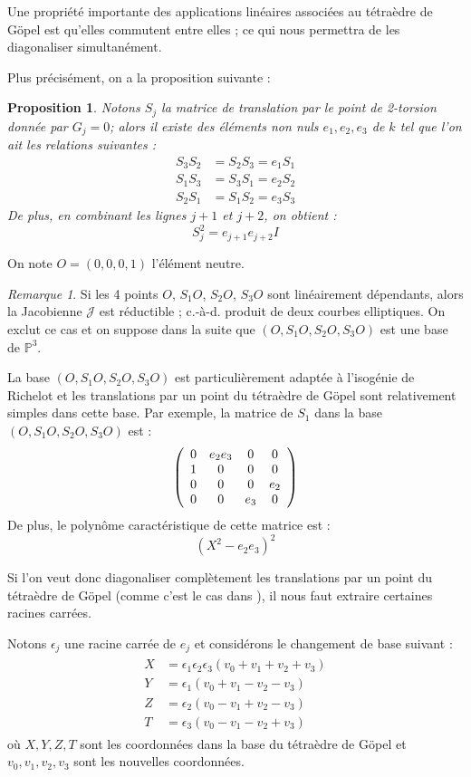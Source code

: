 \documentclass[a4paper,12pt]{article}
\newtheorem{proposition}[theoreme]{Proposition}
\theoremstyle{definition}
\theoremstyle{remark}
\newtheorem{remarque}{Remarque}
\numberwithin{equation}{section}
\begin{document}
Une propriété importante des applications linéaires associées au tétraèdre de G\"opel est qu'elles commutent entre elles \citep{cassels-Flynn}; ce qui nous permettra de les diagonaliser simultanément. 

Plus précisément, on a la proposition suivante :

\begin{proposition}
Notons $S_j$ la matrice de translation par le point de 2-torsion donnée par $G_j=0$; alors il existe des éléments non nuls $e_1,e_2,e_3$ de $k$ tel que l'on ait les relations suivantes :
\begin{align*}
S_3S_2 &= S_2S_3 = e_1S_1 \\
S_1S_3 &= S_3S_1 = e_2S_2 \\
S_2S_1 &= S_1S_2 = e_3S_3
\end{align*}
De plus, en combinant les lignes $j+1$ et $j+2$, on obtient :
$$S_j^2 = e_{j+1}e_{j+2}I$$
\end{proposition}

On note $O=(0,0,0,1)$ l'élément neutre.
\begin{remarque}
Si les 4 points $O$, $S_1O$, $S_2O$, $S_3O$ sont linéairement dépendants, alors la Jacobienne $\mathcal{J}$ est réductible \citep{cassels-Flynn}; c.-à-d. produit de deux courbes elliptiques. On exclut ce cas et on suppose dans la suite que $(O,S_1O,S_2O,S_3O)$ est une base de $\mathbb{P}^3$.
\end{remarque}

La base $(O,S_1O,S_2O,S_3O)$ est particulièrement adaptée à l'isogénie de Richelot et les translations par un point du tétraèdre de G\"opel sont relativement simples dans cette base. Par exemple, la matrice de $S_1$ dans la base  $(O,S_1O,S_2O,S_3O)$ est :
\[ \left(
  \begin{array}{ c c c c}
     0 & e_2e_3 & 0  & 0  \\
     1 & 0   & 0  & 0  \\
     0 & 0   & 0  & e_2 \\
     0 & 0   & e_3  & 0  \\
  \end{array} \right)
\]
De plus, le polynôme caractéristique de cette matrice est :
$$(X^2-e_2e_3)^2$$

Si l'on veut donc diagonaliser complètement les translations par un point du tétraèdre de G\"opel (comme c'est le cas dans \citep{gaudry}), il nous faut extraire certaines racines carrées.

Notons $\epsilon_j$ une racine carrée de $e_j$ et considérons le changement de base suivant \citep{cassels-Flynn} :
\begin{align}
\begin{split}
\label{chgBase}
X &= \epsilon_1\epsilon_2\epsilon_3(v_0+v_1+v_2+v_3) \\
Y &= \epsilon_1(v_0+v_1-v_2-v_3) \\
Z &= \epsilon_2(v_0-v_1+v_2-v_3) \\
T &= \epsilon_3(v_0-v_1-v_2+v_3)
\end{split}
\end{align}
où $X,Y,Z,T$ sont les coordonnées dans la base du tétraèdre de G\"opel et $v_0,v_1,v_2,v_3$ sont les nouvelles coordonnées.
\end{document}
